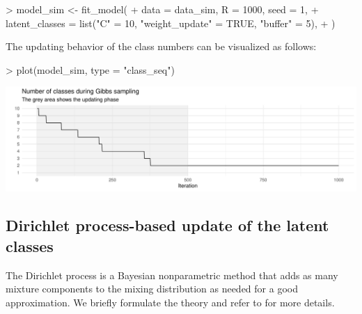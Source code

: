 \documentclass[article,shortnames]{jss}
\begin{document}
\begin{Schunk}
\begin{Sinput}
> model_sim <- fit_model(
+    data = data_sim, R = 1000, seed = 1,
+    latent_classes = list("C" = 10, "weight_update" = TRUE, "buffer" = 5),
+  )
\end{Sinput}
\end{Schunk}

The updating behavior of the class numbers can be visualized as follows:

\begin{Schunk}
\begin{Sinput}
> plot(model_sim, type = "class_seq")
\end{Sinput}
\end{Schunk}
\includegraphics{rprobitb_oelschlaeger_bauer-model-sim-class-seq}

\subsection{Dirichlet process-based update of the latent classes} \label{subsec:dp_update}

The Dirichlet process is a Bayesian nonparametric method that adds as many mixture components to the mixing distribution as needed for a good approximation. We briefly formulate the theory and refer to \cite{Neal:2000} for more details.
\end{document}
